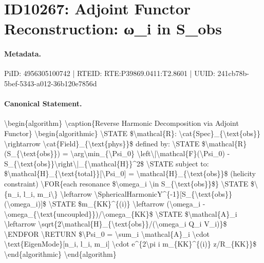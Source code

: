 \section*{ID10267: Adjoint Functor Reconstruction: ω\_i in S\_obs}
\paragraph{Metadata.}
PiID: 4956305100742 | RTEID: RTE:P39869.0411:T2.8601 | UUID: 241cb78b-5bef-5343-a012-36b120e7856d

\paragraph{Canonical Statement.}
\textbackslash{}begin\{algorithm\} \textbackslash{}caption\{Reverse Harmonic Decomposition via Adjoint Functor\} \textbackslash{}begin\{algorithmic\} \textbackslash{}STATE \$\textbackslash{}mathcal\{R\}: \textbackslash{}cat\{Spec\}\_\{\textbackslash{}text\{obs\}\} \textbackslash{}rightarrow \textbackslash{}cat\{Field\}\_\{\textbackslash{}text\{phys\}\}\$ defined by: \textbackslash{}STATE \$\textbackslash{}mathcal\{R\}(S\_\{\textbackslash{}text\{obs\}\}) = \textbackslash{}arg\textbackslash{}min\_\{\textbackslash{}Psi\_0\} \textbackslash{}left\textbackslash{}|\textbackslash{}mathcal\{F\}(\textbackslash{}Psi\_0) - S\_\{\textbackslash{}text\{obs\}\}\textbackslash{}right\textbackslash{}|\_\{\textbackslash{}mathcal\{H\}\}\textasciicircum{}2\$ \textbackslash{}STATE subject to: \$\textbackslash{}mathcal\{H\}\_\{\textbackslash{}text\{total\}\}[\textbackslash{}Psi\_0] = \textbackslash{}mathcal\{H\}\_\{\textbackslash{}text\{obs\}\}\$ (helicity constraint) \textbackslash{}FOR\{each resonance \$\textbackslash{}omega\_i \textbackslash{}in S\_\{\textbackslash{}text\{obs\}\}\$\} \textbackslash{}STATE \$\textbackslash{}\{n\_i, l\_i, m\_i\textbackslash{}\} \textbackslash{}leftarrow \textbackslash{}SphericalHarmonicY\textasciicircum{}\{-1\}[S\_\{\textbackslash{}text\{obs\}\}(\textbackslash{}omega\_i)]\$ \textbackslash{}STATE \$m\_\{KK\}\textasciicircum{}\{(i)\} \textbackslash{}leftarrow (\textbackslash{}omega\_i - \textbackslash{}omega\_\{\textbackslash{}text\{uncoupled\}\})/\textbackslash{}omega\_\{KK\}\$ \textbackslash{}STATE \$\textbackslash{}mathcal\{A\}\_i \textbackslash{}leftarrow \textbackslash{}sqrt\{2\textbackslash{}mathcal\{H\}\_\{\textbackslash{}text\{obs\}\}/(\textbackslash{}omega\_i Q\_i V\_i)\}\$ \textbackslash{}ENDFOR \textbackslash{}RETURN \$\textbackslash{}Psi\_0 = \textbackslash{}sum\_i \textbackslash{}mathcal\{A\}\_i \textbackslash{}cdot \textbackslash{}text\{EigenMode\}[n\_i, l\_i, m\_i] \textbackslash{}cdot e\textasciicircum{}\{2\textbackslash{}pi i m\_\{KK\}\textasciicircum{}\{(i)\} z/R\_\{KK\}\}\$ \textbackslash{}end\{algorithmic\} \textbackslash{}end\{algorithm\}

